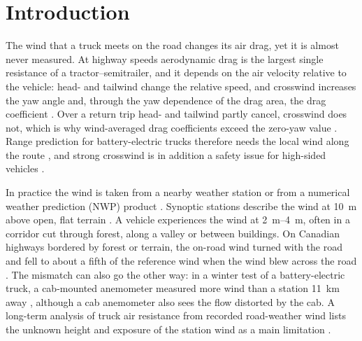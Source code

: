 \section{Introduction}
\label{sec:intro}

The wind that a truck meets on the road changes its air drag, yet it is almost never measured. At highway speeds aerodynamic drag is the largest single resistance of a tractor--semitrailer, and it depends on the air velocity relative to the vehicle: head- and tailwind change the relative speed, and crosswind increases the yaw angle and, through the yaw dependence of the drag area, the drag coefficient \citep{Askerdal2024crosswind}. Over a return trip head- and tailwind partly cancel, crosswind does not, which is why wind-averaged drag coefficients exceed the zero-yaw value \citep{Windsor2014}. Range prediction for battery-electric trucks therefore needs the local wind along the route \citep{Askerdal2025winter,Shiledar2026}, and strong crosswind is in addition a safety issue for high-sided vehicles \citep{Baker1986,ArayaReyes2026}.

In practice the wind is taken from a nearby weather station or from a numerical weather prediction (NWP) product \citep{Filla2025data,Filla2026}. Synoptic stations describe the wind at \SI{10}{m} above open, flat terrain \citep{WMO8}. A vehicle experiences the wind at \SIrange{2}{4}{m}, often in a corridor cut through forest, along a valley or between buildings. On Canadian highways bordered by forest or terrain, the on-road wind turned with the road and fell to about a fifth of the reference wind when the wind blew across the road \citep{McTavish2024}. The mismatch can also go the other way: in a winter test of a battery-electric truck, a cab-mounted anemometer measured more wind than a station \SI{11}{km} away \citep{Askerdal2025winter}, although a cab anemometer also sees the flow distorted by the cab. A long-term analysis of truck air resistance from recorded road-weather wind lists the unknown height and exposure of the station wind as a main limitation \citep{Filla2026}.


